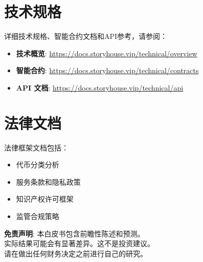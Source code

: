 \documentclass[12pt,a4paper]{article}
\begin{document}
\tableofcontents
\newpage


\newpage


\newpage


\newpage


\newpage


\newpage


\newpage


\newpage


\newpage


\newpage


\newpage


\newpage


\newpage

\appendix

\section{技术规格}
\label{appendix:technical}

详细技术规格、智能合约文档和API参考，请参阅：

\begin{itemize}
    \item \textbf{技术概览}: \url{https://docs.storyhouse.vip/technical/overview}
    \item \textbf{智能合约}: \url{https://docs.storyhouse.vip/technical/contracts}
    \item \textbf{API 文档}: \url{https://docs.storyhouse.vip/technical/api}
\end{itemize}

\section{法律文档}
\label{appendix:legal}

法律框架文档包括：

\begin{itemize}
    \item 代币分类分析
    \item 服务条款和隐私政策
    \item 知识产权许可框架
    \item 监管合规策略
\end{itemize}

\vfill
\begin{center}
\textcolor{storygray}{\small
\textbf{免责声明}: 本白皮书包含前瞻性陈述和预测。\\
实际结果可能会有显著差异。这不是投资建议。\\
请在做出任何财务决定之前进行自己的研究。
}
\end{center}
\end{document}
